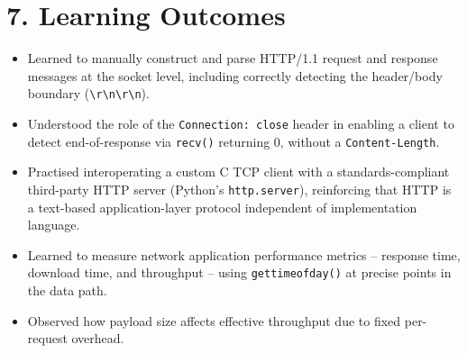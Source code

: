 \documentclass[11pt]{article}
\begin{document}
\section*{7. Learning Outcomes}
\begin{itemize}
  \item Learned to manually construct and parse HTTP/1.1 request and response messages at the
        socket level, including correctly detecting the header/body boundary
        (\texttt{\textbackslash r\textbackslash n\textbackslash r\textbackslash n}).
  \item Understood the role of the \texttt{Connection: close} header in enabling a client to
        detect end-of-response via \texttt{recv()} returning 0, without a \texttt{Content-Length}.
  \item Practised interoperating a custom C TCP client with a standards-compliant third-party HTTP
        server (Python's \texttt{http.server}), reinforcing that HTTP is a text-based
        application-layer protocol independent of implementation language.
  \item Learned to measure network application performance metrics -- response time, download
        time, and throughput -- using \texttt{gettimeofday()} at precise points in the data path.
  \item Observed how payload size affects effective throughput due to fixed per-request overhead.
\end{itemize}
\end{document}
